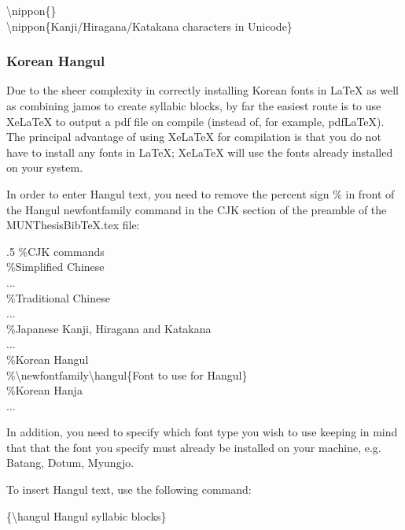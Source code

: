 \documentclass[12pt]{MUNThesisBibTeX}
\newcommand{\nippon}[1]{\begin{CJK}{UTF8}{ipam}#1\end{CJK}}
\begin{document}
\textbackslash nippon\{\}\\
\textbackslash nippon\{Kanji/Hiragana/Katakana characters in Unicode\}\\


\subsubsection{Korean Hangul}
Due to the sheer complexity in correctly installing Korean fonts in LaTeX as well as combining jamos to create syllabic blocks, by far the easiest route is to use XeLaTeX to output a pdf file on compile (instead of, for example, pdfLaTeX). The principal advantage of using XeLaTeX for compilation is that you do not have to install any fonts in LaTeX; XeLaTeX will use the fonts already installed on your system.

In order to enter Hangul text, you need to remove the percent sign \% in front of the Hangul newfontfamily command in the CJK section of the preamble of the MUNThesisBibTeX.tex file:

{\setlength{\baselineskip}
{.5\baselineskip}
\%CJK commands\\
\%Simplified Chinese\\
...\\
\%Traditional Chinese\\
...\\
\%Japanese Kanji, Hiragana and Katakana\\
...\\
\%Korean Hangul\\
\%\textbackslash newfontfamily\textbackslash hangul\{Font to use for Hangul\}\\
\%Korean Hanja\\
...\\\par}

In addition, you need to specify which font type you wish to use keeping in mind that that the font you specify must already be installed on your machine, e.g. Batang, Dotum, Myungjo.

To insert Hangul text, use the following command:

\{\textbackslash hangul Hangul syllabic blocks\}

\end{document}
